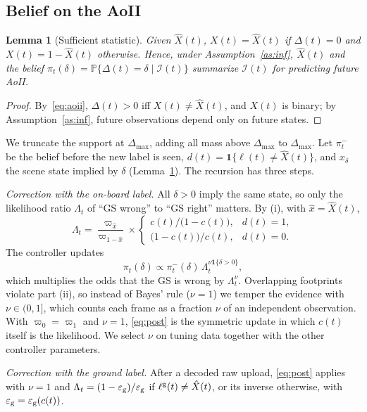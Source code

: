 \documentclass[conference]{IEEEtran}
\newtheorem{lemma}{Lemma}
\theoremstyle{remark}
\newcommand{\Prob}{\mathbb{P}}
\newcommand{\ind}[1]{\mathbf{1}\{#1\}}
\newcommand{\I}{\mathcal{I}}
\newcommand{\lab}{\ell}
\newcommand{\ee}{\varepsilon}
\newcommand{\xh}{\hat{x}}
\begin{document}
\subsection{Belief on the AoII}\label{sec:belief}
\begin{lemma}[Sufficient statistic]\label{lem:suff}
Given $\hat X(t)$, $X(t)=\hat X(t)$ if $\Delta(t)=0$ and $X(t)=1-\hat X(t)$ otherwise. Hence, under Assumption~\ref{as:inf}, $\hat X(t)$ and the belief $\pi_t(\delta)=\Prob\{\Delta(t)=\delta\mid\I(t)\}$ summarize $\I(t)$ for predicting future AoII.
\end{lemma}
\begin{proof}
By~\eqref{eq:aoii}, $\Delta(t)>0$ iff $X(t)\neq\hat X(t)$, and $X(t)$ is binary; by Assumption~\ref{as:inf}, future observations depend only on future states.
\end{proof}

We truncate the support at $\Delta_{\max}$, adding all mass above $\Delta_{\max}$ to $\Delta_{\max}$. Let $\pi^-_t$ be the belief before the new label is seen, $d(t)=\ind{\lab(t)\neq\hat X(t)}$, and $x_\delta$ the scene state implied by $\delta$ (Lemma~\ref{lem:suff}). The recursion has three steps.

\emph{Correction with the on-board label.} All $\delta>0$ imply the same state, so only the likelihood ratio $\Lambda_t$ of ``GS wrong'' to ``GS right'' matters. By (i), with $\xh=\hat X(t)$,
\begin{equation}\label{eq:Lambda}
\Lambda_t=\frac{\varpi_{\xh}}{\varpi_{1-\xh}}\times\begin{cases}c(t)/\big(1-c(t)\big), & d(t)=1,\\ \big(1-c(t)\big)/c(t), & d(t)=0.\end{cases}
\end{equation} The controller updates
\begin{equation}\label{eq:post}
\pi_t(\delta)\propto\pi^-_t(\delta)\,\Lambda_t^{\nu\ind{\delta>0}},
\end{equation}
which multiplies the odds that the GS is wrong by $\Lambda_t^{\nu}$. Overlapping footprints violate part (ii), so instead of Bayes' rule ($\nu=1$) we temper the evidence with $\nu\in(0,1]$, which counts each frame as a fraction $\nu$ of an independent observation. With $\varpi_0=\varpi_1$ and $\nu=1$, \eqref{eq:post} is the symmetric update in which $c(t)$ itself is the likelihood. We select $\nu$ on tuning data together with the other controller parameters.

\emph{Correction with the ground label.} After a decoded raw upload, \eqref{eq:post} applies with $\nu=1$ and $\Lambda_t=(1-\ee_{\rm g})/\ee_{\rm g}$ if $\lab^{\rm g}(t)\neq\hat X(t)$, or its inverse otherwise, with $\ee_{\rm g}=\ee_{\rm g}(c(t))$.
\end{document}
